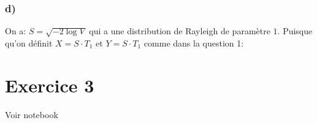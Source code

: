 \documentclass[math, info]{mpb-cours}
\begin{document}
\subsubsection{d)}
On a: $S = \sqrt{- 2\log V}$ qui a une distribution de Rayleigh de paramètre $1$.
Puisque qu'on définit $X = S\cdot T_{1}$ et $Y = S\cdot T_{1}$ comme dans la question 1:

\section{Exercice 3}
Voir notebook
\end{document}
